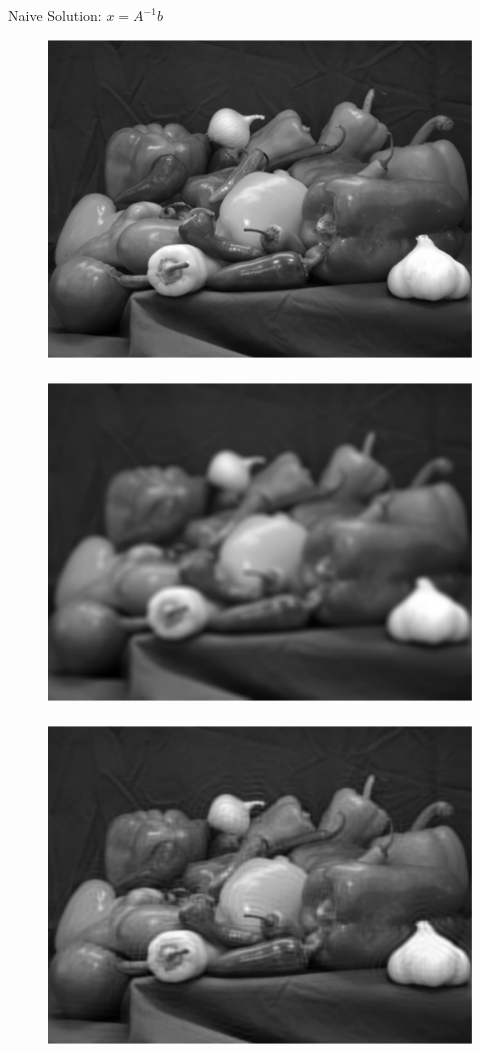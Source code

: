 \documentclass[12pt]{beamer}
\begin{document}
\begin{frame}{Naive Solution: $x = A^{-1}b$}
\begin{figure}
\centering
\includegraphics[scale=0.2]{../figures/fig1} \,
\includegraphics[scale=0.2]{../figures/fig2} \,
\includegraphics[scale=0.2]{../figures/fig3} \\

\end{figure}
\end{frame}
\end{document}
